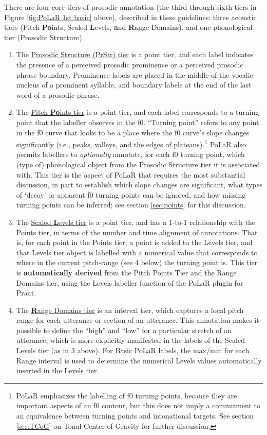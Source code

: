 There are four core tiers of prosodic annotation (the third through sixth tiers in Figure \ref{fig:PoLaR 1st basic} above), described in these guidelines: three acoustic tiers (Pitch \textbf{Po}ints, Scaled \textbf{L}evels, \textbf{a}nd \textbf{R}ange Domains), and one phonological tier (Prosodic Structure).

\begin{enumerate} \def\labelenumi{\arabic{enumi}.}
\item The \uline{Prosodic Structure (PrStr) tier} is a point tier, and each label indicates the presence of a perceived prosodic prominence or a perceived prosodic phrase boundary. Prominence labels are placed in the middle of the vocalic nucleus of a prominent syllable, and boundary labels at the end of the last word of a prosodic phrase.
\item The \uline{Pitch \textbf{Po}ints tier} is a point tier, and each label corresponds to a turning point that the labeller observes in the f0. “Turning point” refers to any point in the f0 curve that looks to be a place where the f0 curve’s slope changes significantly (i.e., peaks, valleys, and the edges of plateaus).\footnote{PoLaR emphasizes the labelling of f0 turning points, because they are important aspects of an f0 contour, but this does not imply a commitment to an equivalence between turning points and intonational targets. See section \ref{sec:TCoG} on Tonal Center of Gravity for further discussion.} PoLaR also permits labellers to \textit{optionally} annotate, for each f0 turning point, which (type of) phonological object from the Prosodic Structure tier it is associated with. This tier is the aspect of PoLaR that requires the most substantial discussion, in part to establish which slope changes are significant, what types of ‘decoy’ or apparent f0 turning points can be ignored, and how missing turning points can be inferred; see section \ref{sec:points} for this discussion.
\item The \uline{Scaled \textbf{L}evels tier} is a point tier, and has a 1-to-1 relationship with the Points tier, in terms of the number and time alignment of annotations. That is, for each point in the Points tier, a point is added to the Levels tier, and that Levels tier object is labelled with a numerical value that corresponds to where in the current pitch-range (see 4 below) the turning point is. This tier is \textbf{automatically derived} from the Pitch Points Tier and the Range Domains tier, using the Levels labeller function of the PoLaR plugin for Praat.
\item The \uline{\textbf{R}ange Domains tier} is an interval tier, which captures a local pitch range for each utterance or section of an utterance. This annotation makes it possible to define the “high” and “low” for a particular stretch of an utterance, which is more explicitly manifested in the labels of the Scaled Levels tier (as in 3 above). For Basic PoLaR labels, the max\slash min for each Range interval is used to determine the numerical Levels values automatically inserted in the Levels tier. \end{enumerate}

